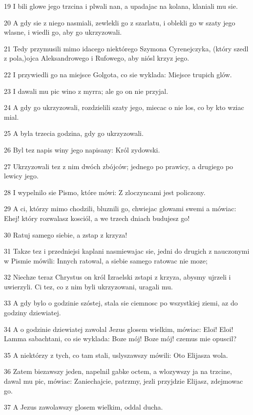 \par 19 I bili glowe jego trzcina i plwali nan, a upadajac na kolana, klaniali mu sie.
\par 20 A gdy sie z niego nasmiali, zewlekli go z szarlatu, i oblekli go w szaty jego wlasne, i wiedli go, aby go ukrzyzowali.
\par 21 Tedy przymusili mimo idacego niektórego Szymona Cyrenejczyka, (który szedl z pola,)ojca Aleksandrowego i Rufowego, aby niósl krzyz jego.
\par 22 I przywiedli go na miejsce Golgota, co sie wyklada: Miejsce trupich glów.
\par 23 I dawali mu pic wino z myrra; ale go on nie przyjal.
\par 24 A gdy go ukrzyzowali, rozdzielili szaty jego, miecac o nie los, co by kto wziac mial.
\par 25 A byla trzecia godzina, gdy go ukrzyzowali.
\par 26 Byl tez napis winy jego napisany: Król zydowski.
\par 27 Ukrzyzowali tez z nim dwóch zbójców; jednego po prawicy, a drugiego po lewicy jego.
\par 28 I wypelnilo sie Pismo, które mówi: Z zloczyncami jest policzony.
\par 29 A ci, którzy mimo chodzili, bluznili go, chwiejac glowami swemi a mówiac: Ehej! który rozwalasz kosciól, a we trzech dniach budujesz go!
\par 30 Ratuj samego siebie, a zstap z krzyza!
\par 31 Takze tez i przedniejsi kaplani nasmiewajac sie, jedni do drugich z nauczonymi w Pismie mówili: Innych ratowal, a siebie samego ratowac nie moze;
\par 32 Niechze teraz Chrystus on król Izraelski zstapi z krzyza, abysmy ujrzeli i uwierzyli. Ci tez, co z nim byli ukrzyzowani, uragali mu.
\par 33 A gdy bylo o godzinie szóstej, stala sie ciemnosc po wszystkiej ziemi, az do godziny dziewiatej.
\par 34 A o godzinie dziewiatej zawolal Jezus glosem wielkim, mówiac: Eloi! Eloi! Lamma sabachtani, co sie wyklada: Boze mój! Boze mój! czemus mie opuscil?
\par 35 A niektórzy z tych, co tam stali, uslyszawszy mówili: Oto Elijasza wola.
\par 36 Zatem biezawszy jeden, napelnil gabke octem, a wlozywszy ja na trzcine, dawal mu pic, mówiac: Zaniechajcie, patrzmy, jezli przyjdzie Elijasz, zdejmowac go.
\par 37 A Jezus zawolawszy glosem wielkim, oddal ducha.
